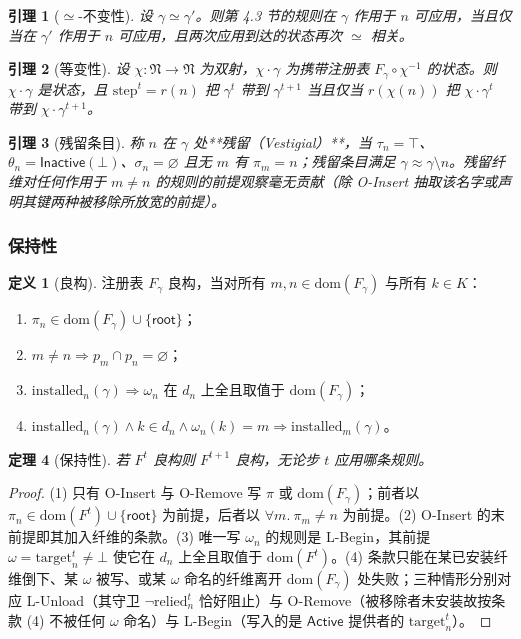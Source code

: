 \documentclass[11pt,a4paper]{article}
\theoremstyle{plain}
\newtheorem{theorem}{定理}
\newtheorem{lemma}[theorem]{引理}
\theoremstyle{definition}
\newtheorem{definition}{定义}
\theoremstyle{remark}
\begin{document}
\begin{lemma}[$\simeq$-不变性]
设 $\gamma \simeq \gamma'$。则第 4.3 节的规则在 $\gamma$ 作用于 $n$ 可应用，当且仅当在 $\gamma'$ 作用于 $n$ 可应用，且两次应用到达的状态再次 $\simeq$ 相关。
\end{lemma}

\begin{lemma}[等变性]
设 $\chi : \mathfrak{N} \to \mathfrak{N}$ 为双射，$\chi \cdot \gamma$ 为携带注册表 $F_\gamma \circ \chi^{-1}$ 的状态。则 $\chi \cdot \gamma$ 是状态，且 $\mathrm{step}^t = r(n)$ 把 $\gamma^t$ 带到 $\gamma^{t+1}$ 当且仅当 $r(\chi(n))$ 把 $\chi \cdot \gamma^t$ 带到 $\chi \cdot \gamma^{t+1}$。
\end{lemma}

\begin{lemma}[残留条目]
称 $n$ 在 $\gamma$ 处**残留（Vestigial）**，当 $\tau_n = \top$、$\theta_n = \mathsf{Inactive}(\bot)$、$\sigma_n = \varnothing$ 且无 $m$ 有 $\pi_m = n$；残留条目满足 $\gamma \approx \gamma \setminus n$。残留纤维对任何作用于 $m \neq n$ 的规则的前提观察毫无贡献（除 O-Insert 抽取该名字或声明其键两种被移除所放宽的前提）。
\end{lemma}

\subsubsection{保持性}

\begin{definition}[良构]
注册表 $F_\gamma$ 良构，当对所有 $m, n \in \mathrm{dom}(F_\gamma)$ 与所有 $k \in K$：
\begin{enumerate}
\item $\pi_n \in \mathrm{dom}(F_\gamma) \cup \{\mathsf{root}\}$；
\item $m \neq n \Rightarrow p_m \cap p_n = \varnothing$；
\item $\mathrm{installed}_n(\gamma) \Rightarrow \omega_n$ 在 $d_n$ 上全且取值于 $\mathrm{dom}(F_\gamma)$；
\item $\mathrm{installed}_n(\gamma) \wedge k \in d_n \wedge \omega_n(k) = m \Rightarrow \mathrm{installed}_m(\gamma)$。
\end{enumerate}
\end{definition}

\begin{theorem}[保持性]
若 $F^t$ 良构则 $F^{t+1}$ 良构，无论步 $t$ 应用哪条规则。
\end{theorem}

\begin{proof}
(1) 只有 O-Insert 与 O-Remove 写 $\pi$ 或 $\mathrm{dom}(F_\gamma)$；前者以 $\pi_n \in \mathrm{dom}(F^t) \cup \{\mathsf{root}\}$ 为前提，后者以 $\forall m.\ \pi_m \neq n$ 为前提。(2) O-Insert 的末前提即其加入纤维的条款。(3) 唯一写 $\omega_n$ 的规则是 L-Begin，其前提 $\omega = \mathrm{target}_n^t \neq \bot$ 使它在 $d_n$ 上全且取值于 $\mathrm{dom}(F^t)$。(4) 条款只能在某已安装纤维倒下、某 $\omega$ 被写、或某 $\omega$ 命名的纤维离开 $\mathrm{dom}(F_\gamma)$ 处失败；三种情形分别对应 L-Unload（其守卫 $\neg \mathrm{relied}_n^t$ 恰好阻止）与 O-Remove（被移除者未安装故按条款 (4) 不被任何 $\omega$ 命名）与 L-Begin（写入的是 $\mathsf{Active}$ 提供者的 $\mathrm{target}_n^t$）。
\end{proof}
\end{document}
